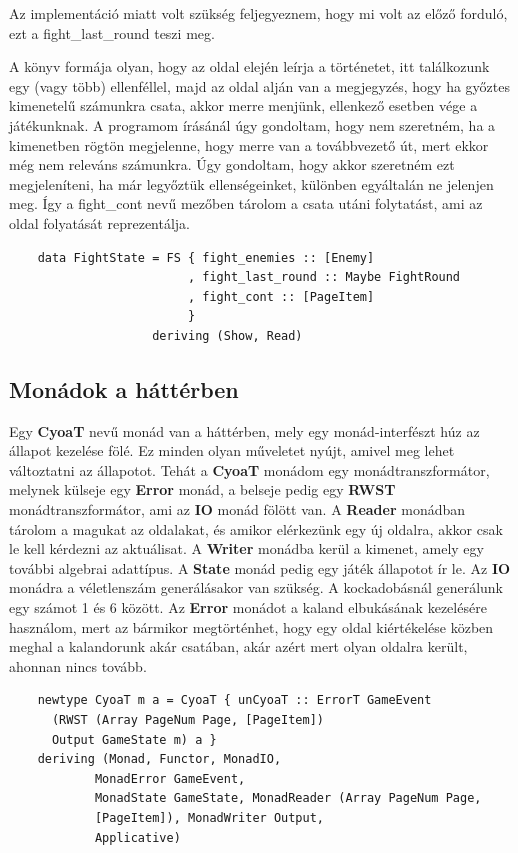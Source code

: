 \documentclass[12pt,a4paper,oneside]{report}
\newcommand{\xstate}[1]{{\color{State}#1}}
\begin{document}
    Az implementáció miatt volt szükség feljegyeznem,
    hogy mi volt az előző forduló, ezt a \xstate{fight\_last\_round} teszi
    meg.

    A könyv formája olyan, hogy az oldal elején leírja a
    történetet, itt találkozunk egy (vagy több) ellenféllel, majd az
    oldal alján van a megjegyzés, hogy ha győztes kimenetelű
    számunkra csata, akkor merre menjünk, ellenkező esetben vége a
    játékunknak. A programom írásánál úgy gondoltam, hogy nem
    szeretném, ha a kimenetben rögtön megjelenne, hogy merre van a
    továbbvezető út, mert ekkor még nem releváns számunkra. Úgy
    gondoltam, hogy akkor szeretném ezt megjeleníteni, ha már
    legyőztük ellenségeinket, különben egyáltalán ne jelenjen
    meg. Így a \xstate{fight\_cont} nevű mezőben tárolom a csata utáni
    folytatást, ami az oldal folyatását reprezentálja.
    \begin{verbatim}
    data FightState = FS { fight_enemies :: [Enemy]
                         , fight_last_round :: Maybe FightRound
                         , fight_cont :: [PageItem]
                         }
                    deriving (Show, Read)
    \end{verbatim}
    
    \subsection{Monádok a háttérben}
    Egy {\bf CyoaT} nevű monád van a háttérben, mely egy monád-interfészt
    húz az állapot kezelése fölé. Ez minden olyan műveletet nyújt,
    amivel meg lehet változtatni az állapotot.  Tehát a {\bf CyoaT} monádom
    egy monádtranszformátor, melynek külseje egy {\bf Error} monád, a
    belseje pedig egy {\bf RWST} monádtranszformátor, ami az {\bf IO} monád fölött
    van. A {\bf Reader} monádban tárolom a magukat az oldalakat, és amikor
    elérkezünk egy új oldalra, akkor csak le kell kérdezni az
    aktuálisat. A {\bf Writer} monádba kerül a kimenet, amely egy további
    algebrai adattípus. A {\bf State} monád pedig egy játék állapotot ír le.
    Az {\bf IO} monádra a véletlenszám generálásakor van szükség. A
    kockadobásnál generálunk egy számot 1 és 6 között. Az {\bf Error}
    monádot a kaland elbukásának kezelésére használom, mert az bármikor
    megtörténhet, hogy egy oldal kiértékelése közben meghal a kalandorunk
    akár csatában, akár azért mert olyan oldalra került, ahonnan nincs
    tovább.
    \begin{verbatim}
    newtype CyoaT m a = CyoaT { unCyoaT :: ErrorT GameEvent
      (RWST (Array PageNum Page, [PageItem])
      Output GameState m) a }
    deriving (Monad, Functor, MonadIO,
            MonadError GameEvent,
            MonadState GameState, MonadReader (Array PageNum Page,
            [PageItem]), MonadWriter Output,
            Applicative)
    \end{verbatim}
\end{document}
